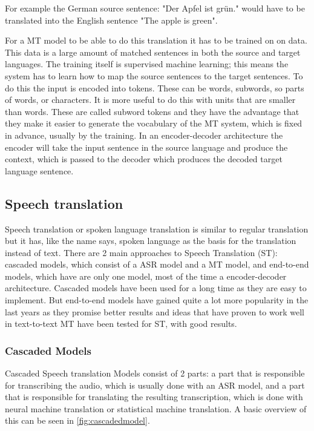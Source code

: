 For example the German source sentence: \color{blue}"Der Apfel ist grün." \color{black} would have to be translated into the English sentence \color{blue}"The apple is green"\color{black}. 

For a MT model to be able to do this translation it has to be trained on on data. This data is a large amount of matched sentences in both the source and target languages. The training itself is supervised machine learning; this means the system has to learn how to map the source sentences to the target sentences. To do this the input is encoded into tokens. These can be words, subwords, so parts of words, or characters. It is more useful to do this with units that are smaller than words. These are called subword tokens and they have the advantage that they make it easier to generate the vocabulary of the MT system, which is fixed in advance, usually by the training. 
In an encoder-decoder architecture the encoder will take the input sentence in the source language and produce the context, which is passed to the decoder which produces the decoded target language sentence. \cite[chapter~13.2]{jm3}


\subsection{Speech translation}
Speech translation or spoken language translation is similar to regular translation but it has, like the name says, spoken language as the basis for the translation instead of text.
There are 2 main approaches to Speech Translation (ST): cascaded models, which consist of a ASR model and a MT model, and end-to-end models, which have are only one model, most of the time a encoder-decoder architecture.
Cascaded models have been used for a long time as they are easy to implement. But end-to-end models have gained quite a lot more popularity in the last years as they promise better results and ideas that have proven to work well in text-to-text MT have been tested for ST, with good results.

\subsubsection{Cascaded Models}
Cascaded Speech translation Models consist of 2 parts: a part that is responsible for transcribing the audio, which is usually done with an ASR model, and a part that is responsible for translating the resulting transcription, which is done with neural machine translation or statistical machine translation. A basic overview of this can be seen in \autoref{fig:cascadedmodel}.

